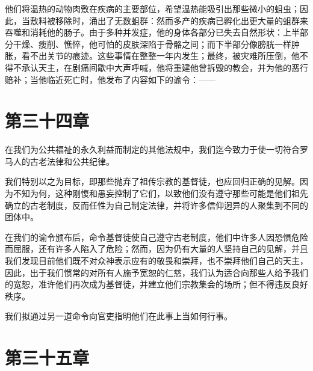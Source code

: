 \par

他们将温热的动物肉敷在疾病的主要部位，希望温热能吸引出那些微小的蛆虫；因此，当敷料被移除时，涌出了无数蛆群：然而多产的疾病已孵化出更大量的蛆群来吞噬和消耗他的肠子。由于多种并发症，他的身体各部分已失去自然形状：上半部分干燥、瘦削、憔悴，他可怕的皮肤深陷于骨骼之间；而下半部分像膀胱一样肿胀，看不出关节的痕迹。这些事情在整整一年内发生；最终，被灾难所压倒，他不得不承认天主，在剧痛间歇中大声呼喊，他将重建他曾拆毁的教会，并为他的恶行赔补；当他临近死亡时，他发布了内容如下的谕令：——\par


\section{第三十四章}

在我们为公共福祉的永久利益而制定的其他法规中，我们迄今致力于使一切符合罗马人的古老法律和公共纪律。\par

我们特别以之为目标，即那些抛弃了祖传宗教的基督徒，也应回归正确的见解。因为不知为何，这种刚愎和愚妄控制了它们，以致他们没有遵守那些可能是他们祖先确立的古老制度，反而任性为自己制定法律，并将许多信仰迥异的人聚集到不同的团体中。\par

在我们的谕令颁布后，命令基督徒使自己遵守古老制度，他们中许多人因恐惧危险而屈服，还有许多人陷入了危险；然而，因为仍有大量的人坚持自己的见解，并且我们发现目前他们既不对众神表示应有的敬畏和崇拜，也不崇拜他们自己的天主，因此，出于我们惯常的对所有人施予宽恕的仁慈，我们认为适合向那些人给予我们的宽恕，准许他们再次成为基督徒，并建立他们宗教集会的场所；但不得违反良好秩序。\par

我们拟通过另一道命令向官吏指明他们在此事上当如何行事。\par

\par


\section{第三十五章}

